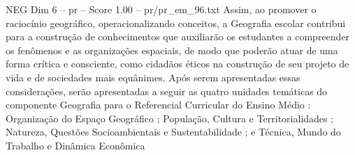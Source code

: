 \begin{textsample}{NEG Dim 6 – pr – Score 1.00 – pr/pr\_em\_96.txt}
Assim, ao promover o raciocínio geográfico, operacionalizando conceitos, a Geografia escolar contribui para a construção de conhecimentos que auxiliarão os estudantes a compreender os fenômenos e as organizações espaciais, de modo que poderão atuar de uma forma crítica e consciente, como cidadãos éticos na construção de seu projeto de vida e de sociedades mais equânimes.
Após serem apresentadas essas considerações, serão apresentadas a seguir as quatro unidades temáticas do componente Geografia para o Referencial Curricular do Ensino Médio : Organização do Espaço Geográfico ; População, Cultura e Territorialidades ; Natureza, Questões Socioambientais e Sustentabilidade ; e Técnica, Mundo do Trabalho e Dinâmica Econômica

\end{textsample}
